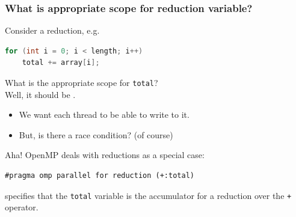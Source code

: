 \begin{frame}[fragile]
  \frametitle{What is appropriate scope for reduction variable?}
  
\begin{changemargin}{1.5cm}
\large
Consider a reduction, e.g.
\begin{lstlisting}[language=C,morekeywords={foreach,pragma,omp,parallel,single,nowait,task,untied,barrier,taskyield}]
for (int i = 0; i < length; i++)
    total += array[i];
\end{lstlisting}

What is the appropriate scope for {\tt total}? \\
\pause
Well, it should be
.

\begin{itemize}
 \item We want each thread to be able to write to it. \pause
 \item But, is there a race condition? (of course)
\end{itemize}

Aha! OpenMP deals with reductions as a special case:


\begin{lstlisting}
#pragma omp parallel for reduction (+:total)
\end{lstlisting}

specifies that the {\tt total} variable is the accumulator for a
reduction over the {\tt +} operator.
\end{changemargin}

\end{frame}


